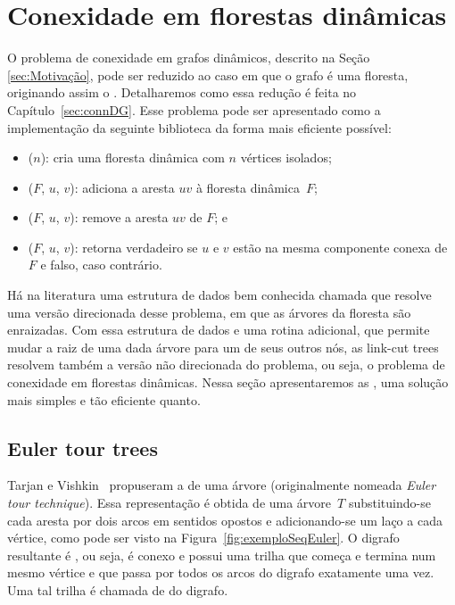 \chapter{Conexidade em florestas dinâmicas}
\label{sec:connDF}

O problema de conexidade em grafos dinâmicos, descrito na Seção \ref{sec:Motivação}, pode ser reduzido ao caso em que o grafo é uma floresta, originando assim o . Detalharemos como essa redução é feita no Capítulo~\ref{sec:connDG}. Esse problema pode ser apresentado como a implementação da seguinte biblioteca da forma mais eficiente possível: 

\begin{itemize}
\item \dymForestCreate($n$): cria uma floresta dinâmica com $n$ vértices isolados;
\item \dymForestAddEdge($F$, $u$, $v$): adiciona a aresta $uv$ à floresta dinâmica~$F$;
\item \dymForestDelEdge($F$, $u$, $v$): remove a aresta $uv$ de $F$; e
\item \dymForestQuery($F$, $u$, $v$): retorna verdadeiro se $u$ e $v$ estão na mesma componente conexa de $F$ e falso, caso contrário.
\end{itemize}
 
Há na literatura uma estrutura de dados bem conhecida chamada  \cite{SleatroTarjanLinkCutTree1983} que resolve uma versão direcionada desse problema, em que as árvores da floresta são enraizadas.
Com essa estrutura de dados e uma rotina adicional, que permite mudar a raiz de uma dada árvore para um de seus outros nós, as link-cut trees resolvem também a versão não direcionada do problema, ou seja, o problema de conexidade em florestas dinâmicas.
Nessa seção apresentaremos as , uma solução mais simples e tão eficiente quanto.


\section{Euler tour trees} 

Tarjan e Vishkin~\cite{tarjan1985} propuseram a  de uma árvore (originalmente nomeada \textit{Euler tour technique}).
Essa representação é obtida de uma árvore~$T$ substituindo-se cada aresta por dois arcos em sentidos opostos e adicionando-se um laço a cada vértice, como pode ser visto na Figura~\ref{fig:exemploSeqEuler}. O digrafo resultante é , ou seja, é conexo e possui uma trilha que começa e termina num mesmo vértice e que passa por todos os arcos do digrafo exatamente uma vez. Uma tal trilha é chamada de  do digrafo.


